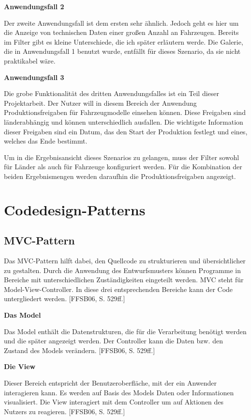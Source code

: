 \textbf{Anwendungsfall 2}

Der zweite Anwendungsfall ist dem ersten sehr ähnlich. Jedoch geht es hier um die Anzeige von technischen Daten einer großen Anzahl an Fahrzeugen. Bereits im Filter gibt es kleine Unterschiede, die ich später erläutern werde. Die Galerie, die in Anwendungsfall 1 benutzt wurde, entfällt für dieses Szenario, da sie nicht praktikabel wäre.

\textbf{Anwendungsfall 3}

Die grobe Funktionalität des dritten Anwendungsfalles ist ein Teil dieser Projektarbeit. Der Nutzer will in diesem Bereich der Anwendung Produktionsfreigaben für Fahrzeugmodelle einsehen können. Diese Freigaben sind länderabhängig und können unterschiedlich ausfallen. Die wichtigste Information dieser Freigaben sind ein Datum, das den Start der Produktion festlegt und eines, welches das Ende bestimmt.

Um in die Ergebnisansicht dieses Szenarios zu gelangen, muss der Filter sowohl für Länder als auch für Fahrzeuge konfiguriert werden. Für die Kombination der beiden Ergebnismengen werden daraufhin die Produktionsfreigaben angezeigt.
\section{Codedesign-Patterns} \label{sec:grundPattern}
\subsection{MVC-Pattern} \label{sec:patternMVC}
Das MVC-Pattern hilft dabei, den Quellcode zu strukturieren und übersichtlicher zu gestalten. Durch die Anwendung des Entwurfsmusters können Programme in Bereiche mit unterschiedlichen Zuständigkeiten eingeteilt werden. MVC steht für Model-View-Controller. In diese drei entsprechenden Bereiche kann der Code untergliedert werden. [FFSB06, S. 529ff.]

\textbf{Das Model}

Das Model enthält die Datenstrukturen, die für die Verarbeitung benötigt werden und die später angezeigt werden. Der Controller kann die Daten bzw. den Zustand des Models verändern. [FFSB06, S. 529ff.]

\textbf{Die View}

Dieser Bereich entspricht der Benutzeroberfläche, mit der ein Anwender interagieren kann. Es werden auf Basis des Models Daten oder Informationen visualisiert. Die View interagiert mit dem Controller um auf Aktionen des Nutzers zu reagieren. [FFSB06, S. 529ff.]


